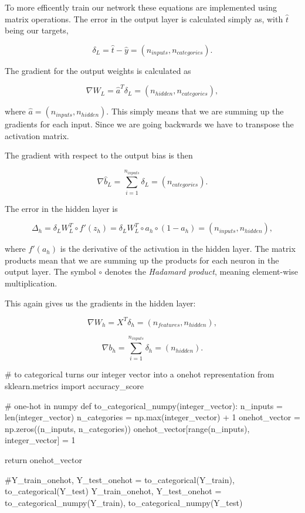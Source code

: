 \documentclass[%
oneside,                 %
final,                   %
10pt]{article}
\begin{document}
To more efficently train our network these equations are implemented using matrix operations.  
The error in the output layer is calculated simply as, with $\hat{t}$ being our targets,  

$$ \delta_L = \hat{t} - \hat{y} = (n_{inputs}, n_{categories}) .$$  

The gradient for the output weights is calculated as  

$$ \nabla W_{L} = \hat{a}^T \delta_L   = (n_{hidden}, n_{categories}) ,$$

where $\hat{a} = (n_{inputs}, n_{hidden})$. This simply means that we are summing up the gradients for each input.  
Since we are going backwards we have to transpose the activation matrix.  

The gradient with respect to the output bias is then  

$$ \nabla \hat{b}_{L} = \sum_{i=1}^{n_{inputs}} \delta_L = (n_{categories}) .$$  

The error in the hidden layer is  

$$ \Delta_h = \delta_L W_{L}^T \circ f'(z_{h}) = \delta_L W_{L}^T \circ a_{h} \circ (1 - a_{h}) = (n_{inputs}, n_{hidden}) ,$$  

where $f'(a_{h})$ is the derivative of the activation in the hidden layer. The matrix products mean
that we are summing up the products for each neuron in the output layer. The symbol $\circ$ denotes
the \emph{Hadamard product}, meaning element-wise multiplication.  

This again gives us the gradients in the hidden layer:  

$$ \nabla W_{h} = X^T \delta_h = (n_{features}, n_{hidden}) ,$$  

$$ \nabla b_{h} = \sum_{i=1}^{n_{inputs}} \delta_h = (n_{hidden}) .$$


\bpycod
# to categorical turns our integer vector into a onehot representation
from sklearn.metrics import accuracy_score

# one-hot in numpy
def to_categorical_numpy(integer_vector):
    n_inputs = len(integer_vector)
    n_categories = np.max(integer_vector) + 1
    onehot_vector = np.zeros((n_inputs, n_categories))
    onehot_vector[range(n_inputs), integer_vector] = 1
    
    return onehot_vector

#Y_train_onehot, Y_test_onehot = to_categorical(Y_train), to_categorical(Y_test)
Y_train_onehot, Y_test_onehot = to_categorical_numpy(Y_train), to_categorical_numpy(Y_test)
\end{document}
